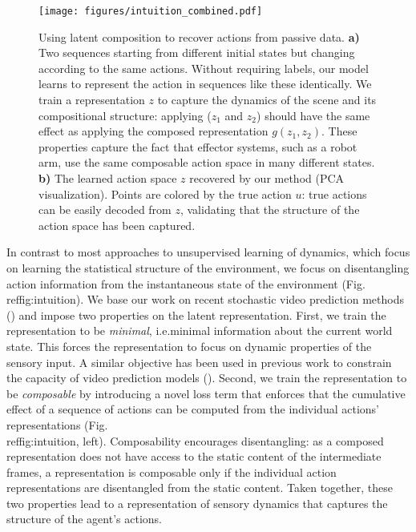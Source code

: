 \documentclass{article} %
\begin{document}
\begin{figure}[t]
  \centering
  \texttt{[image: figures/intuition\_combined.pdf]}\vspace{-15pt}
  \caption{Using latent composition to recover actions from passive data. \textbf{a)} Two sequences starting from different initial states but changing according to the same actions. Without requiring labels, our model learns to represent the action in sequences like these identically. We train a representation $z$ to capture the dynamics of the scene and its compositional structure: applying ($z_1$ and $z_2$) should have the same effect as applying the composed representation $g(z_1, z_2)$. These properties capture the fact that effector systems, such as a robot arm, use the same composable action space in many different states. \textbf{b)} The learned action space $z$ recovered by our method (PCA visualization). Points are colored by the true action $u$: true actions can be easily decoded from $z$, validating that the structure of the action space has been captured. }
  \label{fig:intuition}
  \vspace{-15pt}
\end{figure}

In contrast to most approaches to unsupervised learning of dynamics, which focus on learning the statistical structure of the environment, we focus on disentangling action information from the instantaneous state of the environment (Fig.\\ref{fig:intuition}). We base our work %
on recent stochastic video prediction methods (\cite{babaeizadeh2018stochastic,denton18stochastic,lee2018savp}) and impose two properties on the latent representation. First, we train the representation to be \textit{minimal}, i.e.\containing minimal information about the current world state. This forces the representation to focus on dynamic properties of the sensory input. A similar objective has been used in previous work to constrain the capacity of video prediction models (\cite{denton18stochastic}). Second, we train the representation to be \textit{composable} by introducing a novel loss term that enforces that the cumulative effect of a sequence of actions can be computed from the individual actions' representations (Fig.\\ref{fig:intuition}, left). Composability encourages disentangling: as a composed representation does not have access to the static content of the intermediate frames, a representation is composable only if the individual action representations are disentangled from the static content. Taken together, these two properties lead to a representation of sensory dynamics that captures the structure of the agent's actions.
\end{document}
